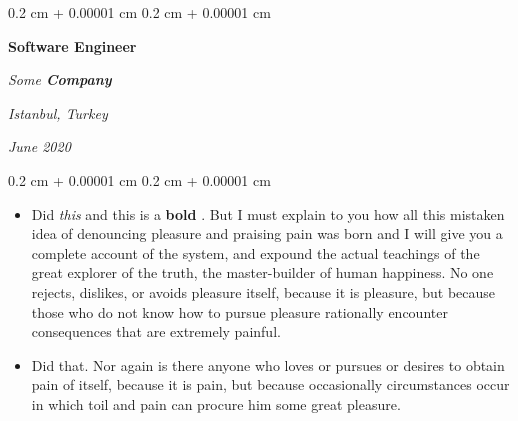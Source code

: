 \documentclass[10pt, letterpaper]{article}
\newenvironment{highlights}{
    \begin{itemize}[
        topsep=0.10 cm,
        parsep=0.10 cm,
        partopsep=0pt,
        itemsep=0pt,
        leftmargin=0.4 cm + 10pt
    ]
}{
    \end{itemize}
} %
\newenvironment{onecolentry}{
    \begin{adjustwidth}{
        0.2 cm + 0.00001 cm
    }{
        0.2 cm + 0.00001 cm
    }
}{
    \end{adjustwidth}
} %
\newenvironment{twocolentry}[2][]{
    \onecolentry
    \def\secondColumn{#2}
    \setcolumnwidth{\fill, 4.5 cm}
    \begin{paracol}{2}
}{
    \switchcolumn \raggedleft \secondColumn
    \end{paracol}
    \endonecolentry
} %
\let\hrefWithoutArrow\href
\renewcommand{\href}[2]{\hrefWithoutArrow{#1}{\ifthenelse{\equal{#2}{}}{ }{#2 }\raisebox{.15ex}{\footnotesize \faExternalLink*}}}
\begin{document}
        \begin{twocolentry}{
        \textit{Istanbul, Turkey}    
            
        \textit{June 2020}}
            \textbf{Software Engineer}
            
            \textit{Some \textbf{Company}}
        \end{twocolentry}
        \vspace{0.10 cm}
        \begin{onecolentry}
            \begin{highlights}
                \item Did \textit{this} and this is a \textbf{bold} \href{https://example.com}{link}. But I must explain to you how all this mistaken idea of denouncing pleasure and praising pain was born and I will give you a complete account of the system, and expound the actual teachings of the great explorer of the truth, the master-builder of human happiness. No one rejects, dislikes, or avoids pleasure itself, because it is pleasure, but because those who do not know how to pursue pleasure rationally encounter consequences that are extremely painful.
                \item Did that. Nor again is there anyone who loves or pursues or desires to obtain pain of itself, because it is pain, but because occasionally circumstances occur in which toil and pain can procure him some great pleasure.
            \end{highlights}
        \end{onecolentry}


        \vspace{0.2 cm}
\end{document}
